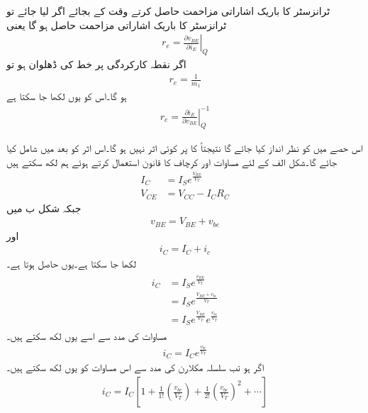 ٹرانزسٹر  کا باریک اشاراتی مزاحمت حاصل کرتے وقت  کے بجائے اگر  لیا جائے تو ٹرانزسٹر کا باریک اشاراتی مزاحمت  حاصل ہو گا یعنی
\begin{align}
r_e = \left . \frac{\partial v_{BE}}{\partial i_E}\right |_Q
\end{align}
اگر نقطہ کارکردگی پر  خط کی ڈھلوان  ہو تو 
\begin{align}
r_e =\frac{1}{m_1}
\end{align}
ہو گا۔اس کو یوں لکھا جا سکتا ہے
\begin{align}
r_e =\left. \frac{\partial i_E}{\partial v_{BE}} \right |_Q^{-1}
\end{align}

اس حصے میں    کو نظر انداز کیا جائے گا نتیجتاً   کا  پر کوئی اثر نہیں ہو گا۔اس اثر کو بعد میں شامل کیا جائے گا۔شکل   الف کے لئے مساوات  اور کرچاف کا قانون استعمال کرتے ہوئے ہم لکھ سکتے ہیں
\begin{align}
I_C&=I_S e^{\frac{V_{BE}}{V_T}} \label{مساوات_ٹرانزسٹر_یک_سمتی_رو_الف}\\
V_{CE}&=V_{CC}-I_C R_C \label{مساوات_ٹرانزسٹر_یک_سمتی_دباو_الف}
\end{align}
جبکہ شکل  ب میں
\begin{align} \label{مساوات_ٹرانزسٹر_داخلی_دباو_کے_یکسمتی_اور_بدلتا_حصے}
v_{BE}=V_{BE}+v_{be}
\end{align}
اور
\begin{align} \label{مساوات_ٹرانزسٹر_رو_کے_یکسمتی_اور_بدلتا_حصے}
i_C=I_C+i_c
\end{align}
لکھا جا سکتا ہے۔یوں حاصل ہوتا ہے۔
\begin{gather}
\begin{aligned}
i_C&=I_S e^{\frac{v_{BE}}{V_T}}\\
&=I_S e^{\frac{V_{BE}+v_{be}}{V_T}}\\
&=I_S e^{\frac{V_{BE}}{V_T}} e^{\frac{v_{be}}{V_T}}
\end{aligned}
\end{gather}
مساوات   کی مدد سے اسے یوں لکھ سکتے ہیں۔
\begin{align}
i_C = I_C e^{\frac{v_{be}}{V_T}}
\end{align}
اگر   ہو تب سلسلہ مکلارن  کی مدد سے اس مساوات کو یوں لکھ سکتے ہیں۔
\begin{align} \label{مساوات_ٹرانزسٹر_سلسلہ+مکلارن}
i_C=I_C \left [1+\frac{1}{1!} \left(\frac{v_{be}}{V_T} \right )+\frac{1}{2!} \left(\frac{v_{be}}{V_T} \right)^2+ \cdots \right ]
\end{align}

